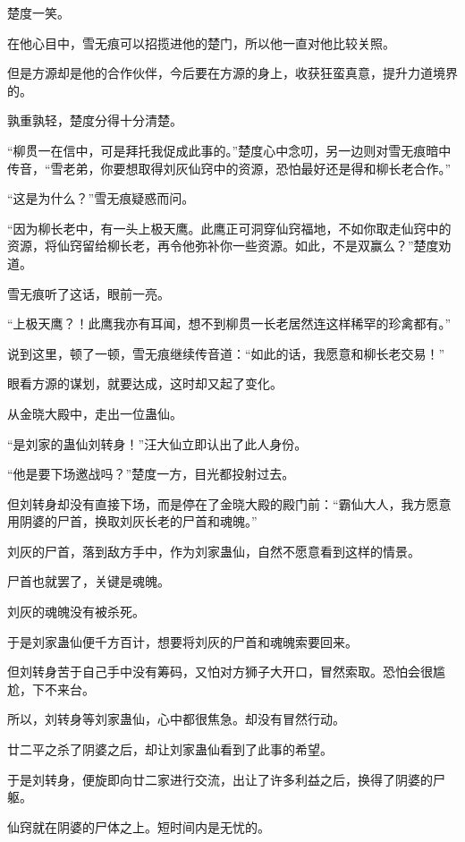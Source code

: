 
\begin{this_body}

楚度一笑。

在他心目中，雪无痕可以招揽进他的楚门，所以他一直对他比较关照。

但是方源却是他的合作伙伴，今后要在方源的身上，收获狂蛮真意，提升力道境界的。

孰重孰轻，楚度分得十分清楚。

“柳贯一在信中，可是拜托我促成此事的。”楚度心中念叨，另一边则对雪无痕暗中传音，“雪老弟，你要想取得刘灰仙窍中的资源，恐怕最好还是得和柳长老合作。”

“这是为什么？”雪无痕疑惑而问。

“因为柳长老中，有一头上极天鹰。此鹰正可洞穿仙窍福地，不如你取走仙窍中的资源，将仙窍留给柳长老，再令他弥补你一些资源。如此，不是双赢么？”楚度劝道。

雪无痕听了这话，眼前一亮。

“上极天鹰？！此鹰我亦有耳闻，想不到柳贯一长老居然连这样稀罕的珍禽都有。”

说到这里，顿了一顿，雪无痕继续传音道：“如此的话，我愿意和柳长老交易！”

眼看方源的谋划，就要达成，这时却又起了变化。

从金晓大殿中，走出一位蛊仙。

“是刘家的蛊仙刘转身！”汪大仙立即认出了此人身份。

“他是要下场邀战吗？”楚度一方，目光都投射过去。

但刘转身却没有直接下场，而是停在了金晓大殿的殿门前：“霸仙大人，我方愿意用阴婆的尸首，换取刘灰长老的尸首和魂魄。”

刘灰的尸首，落到敌方手中，作为刘家蛊仙，自然不愿意看到这样的情景。

尸首也就罢了，关键是魂魄。

刘灰的魂魄没有被杀死。

于是刘家蛊仙便千方百计，想要将刘灰的尸首和魂魄索要回来。

但刘转身苦于自己手中没有筹码，又怕对方狮子大开口，冒然索取。恐怕会很尴尬，下不来台。

所以，刘转身等刘家蛊仙，心中都很焦急。却没有冒然行动。

廿二平之杀了阴婆之后，却让刘家蛊仙看到了此事的希望。

于是刘转身，便旋即向廿二家进行交流，出让了许多利益之后，换得了阴婆的尸躯。

仙窍就在阴婆的尸体之上。短时间内是无忧的。


\end{this_body}
